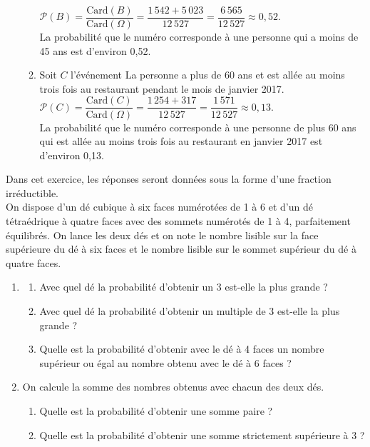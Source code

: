 \begin{corrige}
\begin{enumerate}
\begin{enumerate}
               $\mathcal{P}(B) =\dfrac{\textrm{Card}(B)}{\textrm{Card}(\Omega)} =\dfrac{1\,542+5\,023}{12\,527} = \dfrac{6\,565}{12\,527} \approx 0,52.$ \\ [1mm]
               {\blue La probabilité que le numéro corresponde à une personne qui a moins de 45 ans est d'environ 0,52}. \\   
            \item Soit $C$ l'événement  \og La personne a plus de 60 ans et est allée au moins trois fois au restaurant pendant le mois de janvier 2017\fg{}. \\ [1mm]
               $\mathcal{P}(C) =\dfrac{\textrm{Card}(C)}{\textrm{Card}(\Omega)} =\dfrac{1\,254+317}{12\,527} =\dfrac{1\,571}{12\,527} \approx 0,13.$ \\ [1mm]
               {\blue La probabilité que le numéro corresponde à une personne de plus 60 ans qui est allée au moins trois fois au restaurant en janvier 2017 est d'environ 0,13}.
         \end{enumerate}
   \end{enumerate}
\end{corrige}

\bigskip


\begin{exercice}[CRPE 2017 G3]
   Dans cet exercice, les réponses seront données sous la forme d’une fraction irréductible. \\
   On dispose d’un dé cubique à six faces numérotées de 1 à 6 et d’un dé tétraédrique à quatre faces avec des sommets numérotés de 1 à 4, parfaitement équilibrés. On lance les deux dés et on note le nombre lisible sur la face supérieure du dé à six faces et le nombre lisible sur le sommet supérieur du dé à quatre faces.
   \begin{enumerate}
      \item
      \begin{enumerate}
         \item Avec quel dé la probabilité d’obtenir un 3 est-elle la plus
grande ?
         \item Avec quel dé la probabilité d’obtenir un multiple de 3 est-elle la plus grande ?
         \item Quelle est la probabilité d’obtenir avec le dé à 4 faces un nombre supérieur ou égal au nombre obtenu avec le dé à 6 faces ?
      \end{enumerate}
      \item On calcule la somme des nombres obtenus avec chacun des deux dés.
      \begin{enumerate}
         \item Quelle est la probabilité d’obtenir une somme paire ?
         \item Quelle est la probabilité d’obtenir une somme strictement supérieure à 3 ?
      \end{enumerate}
   \end{enumerate}
\end{exercice}


